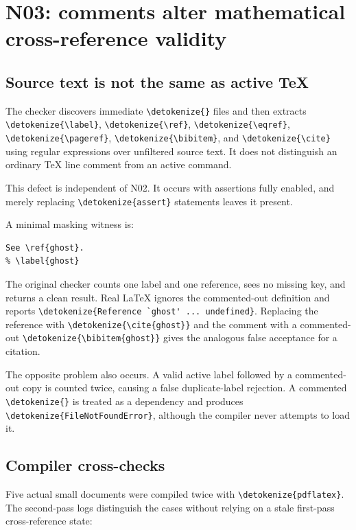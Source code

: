 \documentclass[11pt,letterpaper]{article}
\newcommand{\code}[1]{\expandafter\nolinkurl\expandafter{\detokenize{#1}}}
\begin{document}
\section{N03: comments alter mathematical cross-reference validity}
\subsection{Source text is not the same as active TeX}

The checker discovers immediate \code{} files and then extracts \code{\label}, \code{\ref}, \code{\eqref}, \code{\pageref}, \code{\bibitem}, and \code{\cite} using regular expressions over unfiltered source text. It does not distinguish an ordinary TeX line comment from an active command.\cite{doccheck}

This defect is independent of N02. It occurs with assertions fully enabled, and merely replacing \code{assert} statements leaves it present.

A minimal masking witness is:
\begin{lstlisting}
See \ref{ghost}.
% \label{ghost}
\end{lstlisting}

The original checker counts one label and one reference, sees no missing key, and returns a clean result. Real LaTeX ignores the commented-out definition and reports \code{Reference `ghost' ... undefined}. Replacing the reference with \code{\cite{ghost}} and the comment with a commented-out \code{\bibitem{ghost}} gives the analogous false acceptance for a citation.

The opposite problem also occurs. A valid active label followed by a commented-out copy is counted twice, causing a false duplicate-label rejection. A commented \code{} is treated as a dependency and produces \code{FileNotFoundError}, although the compiler never attempts to load it.

\subsection{Compiler cross-checks}

Five actual small documents were compiled twice with \code{pdflatex}. The second-pass logs distinguish the cases without relying on a stale first-pass cross-reference state:
\end{document}
